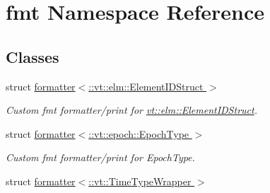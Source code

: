 \hypertarget{namespacefmt}{}\section{fmt Namespace Reference}
\label{namespacefmt}
\subsection*{Classes}
\begin{DoxyCompactItemize}
\item 
struct \hyperlink{structfmt_1_1formatter_3_1_1vt_1_1elm_1_1_element_i_d_struct_01_4}{formatter$<$\+::vt\+::elm\+::\+Element\+I\+D\+Struct $>$}
\begin{DoxyCompactList}\small\item\em Custom fmt formatter/print for {\ttfamily \hyperlink{structvt_1_1elm_1_1_element_i_d_struct}{vt\+::elm\+::\+Element\+I\+D\+Struct}}. \end{DoxyCompactList}\item 
struct \hyperlink{structfmt_1_1formatter_3_1_1vt_1_1epoch_1_1_epoch_type_01_4}{formatter$<$\+::vt\+::epoch\+::\+Epoch\+Type $>$}
\begin{DoxyCompactList}\small\item\em Custom fmt formatter/print for {\ttfamily Epoch\+Type}. \end{DoxyCompactList}\item 
struct \hyperlink{structfmt_1_1formatter_3_1_1vt_1_1_time_type_wrapper_01_4}{formatter$<$\+::vt\+::\+Time\+Type\+Wrapper $>$}
\end{DoxyCompactItemize}
